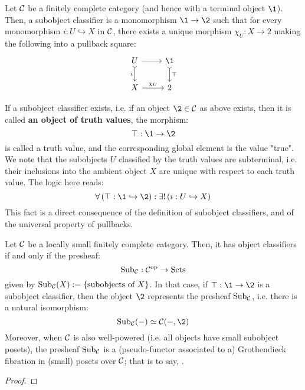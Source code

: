         \begin{definition}
            Let $\mathcal{C}$ be a finitely complete category (and hence with a terminal object $\1$). Then, a subobject classifier is a monomorphism $\1 \to \2$ such that for every monomorphism $i: U \hookrightarrow X$ in $\mathcal{C}$, there exists a unique morphism $\chi_U: X \to 2$ making the following into a pullback square:
                $$
                    \begin{tikzcd}
                        U \arrow[d, "i"', tail] \arrow[r] & \1 \arrow[d, "\top", tail] \\
                        X \arrow[r, "\chi_U"]             & 2                         
                    \end{tikzcd}
                $$
        \end{definition}
        \begin{convention}
            If a subobject classifier exists, i.e. if an object $\2 \in \C$ as above exists, then it is called \textbf{an object of truth values}, the morphism:
                $$\top: \1 \to \2$$
            is called a truth value, and the corresponding global element is the value "true".
            \\
            We note that the subobjects $U$ classified by the truth values are subterminal, i.e. their inclusions into the ambient object $X$ are unique with respect to each truth value. The logic here reads:
                $$\forall \left(\top: \1 \hookrightarrow \2\right): \exists! \left(i: U \hookrightarrow X\right)$$
            This fact is a direct consequence of the definition of subobject classifiers, and of the universal property of pullbacks.
        \end{convention}
        
        \begin{proposition}
            Let $\mathcal{C}$ be a locally small finitely complete category. Then, it has object classifiers if and only if the presheaf:
                $$\mathrm{Sub}_{\mathcal{C}}: \mathcal{C}^{\mathrm{op}} \to \mathrm{Sets}$$
            given by $\mathrm{Sub}_{\mathcal{C}}(X) := \{\text{subobjects of $X$}\}$. In that case, if $\top: \1 \to \2$ is a subobject classifier, then the object $\2$ represents the presheaf $\mathrm{Sub}_{\mathcal{C}}$, i.e. there is a natural isomorphism:
                $$\Sub_{\C}(-) \cong \C(-, \2)$$
            Moreover, when $\mathcal{C}$ is also well-powered (i.e. all objects have small subobject posets), the presheaf $\mathrm{Sub}_{\mathcal{C}}$ is a (pseudo-functor associated to a) Grothendieck fibration in (small) posets over $\mathcal{C}$; that is to say, . 
        \end{proposition}
            \begin{proof}
                
            \end{proof}
            
